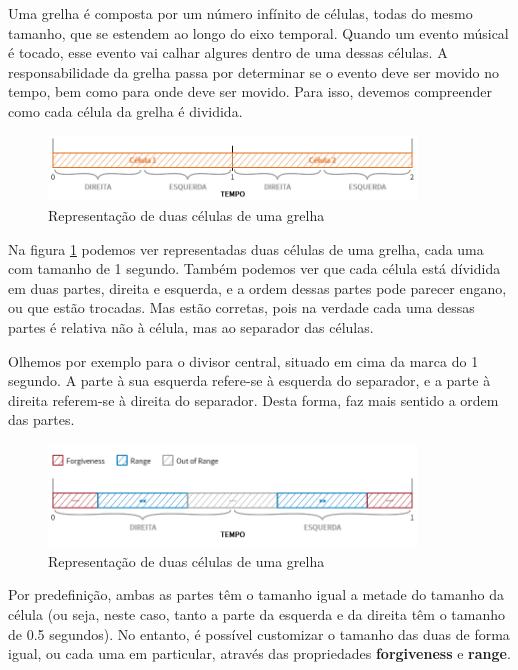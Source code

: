 Uma grelha é composta por um número infínito de células, todas do mesmo tamanho, que se estendem ao longo do eixo temporal. Quando um evento músical é tocado, esse evento vai calhar algures dentro de uma dessas células. A responsabilidade da grelha passa por determinar se o evento deve ser movido no tempo, bem como para onde deve ser movido. Para isso, devemos compreender como cada célula da grelha é dividida.

\begin{figure}[h]
\begin{center}
    \includegraphics[width=0.87\textwidth]{img/grids_1.png}
\end{center}
\caption{Representação de duas células de uma grelha}
\label{fig:grids-1}
\end{figure}

Na figura \ref{fig:grids-1} podemos ver representadas duas células de uma grelha, cada uma com tamanho de 1 segundo. Também podemos ver que cada célula está dívidida em duas partes, direita e esquerda, e a ordem dessas partes pode parecer engano, ou que estão trocadas. Mas estão corretas, pois na verdade cada uma dessas partes é relativa não à célula, mas ao separador das células.

Olhemos por exemplo para o divisor central, situado em cima da marca do 1 segundo. A parte à sua esquerda refere-se à esquerda do separador, e a parte à direita referem-se à direita do separador. Desta forma, faz mais sentido a ordem das partes.

\begin{figure}[h]
\begin{center}
    \includegraphics[width=0.87\textwidth]{img/grids_2.png}
\end{center}
\caption{Representação de duas células de uma grelha}
\label{fig:grids-2}
\end{figure}

Por predefinição, ambas as partes têm o tamanho igual a metade do tamanho da célula (ou seja, neste caso, tanto a parte da esquerda e da direita têm o tamanho de 0.5 segundos). No entanto, é possível customizar o tamanho das duas de forma igual, ou cada uma em particular, através das propriedades \textbf{forgiveness} e \textbf{range}.

